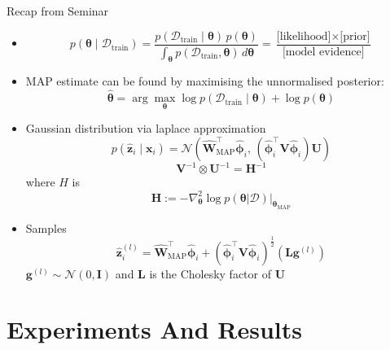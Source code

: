 \documentclass[aspectratio=169,xcolor=dvipsnames]{beamer}
\begin{document}
\begin{frame}{Recap from Seminar}
    \begin{itemize}
        \item<1-> 
        \[
        p(\boldsymbol{\theta} \mid \mathcal{D}_{\text{train}})
        = \frac{p(\mathcal{D}_{\text{train}} \mid \boldsymbol{\theta}) \, p(\boldsymbol{\theta})}{\int_{\boldsymbol{\theta}} p(\mathcal{D}_{\text{train}}, \boldsymbol{\theta}) \, d\boldsymbol{\theta}}
        = \frac{\text{[likelihood]} \times \text{[prior]}}{\text{[model evidence]}}
    \]
        \item<2-> MAP estimate can be found by maximising the unnormalised posterior:
        \[
        \hat{\boldsymbol{\theta}} = \arg\max_{\boldsymbol{\theta}} \log p(\mathcal{D}_{\text{train}} \mid \boldsymbol{\theta}) + \log p(\boldsymbol{\theta})
              \]
        \item<3-> Gaussian distribution via laplace approximation
        \[
        p(\hat{\mathbf{z}}_i \mid \mathbf{x}_i) = \mathcal{N}(\hat{\mathbf{W}}_{\text{MAP}}^\top \hat{\boldsymbol{\phi}}_i, \, (\hat{\boldsymbol{\phi}}_i^\top \mathbf{V} \hat{\boldsymbol{\phi}}_i) \mathbf{U})
        \]
        \[
            \mathbf{V}^{-1} \otimes \mathbf{U}^{-1} = \mathbf{H}^{-1}
        \] where $H$ is 
        \[ \mathbf{H} := - \nabla_{\boldsymbol{\theta}}^2 \log p(\boldsymbol{\theta} | \mathcal{D}) \Big|_{\boldsymbol{\theta}_{\text{MAP}}} \]
        \item<4-> Samples
        \[
         \hat{\mathbf{z}}_i^{(l)} = \hat{\mathbf{W}}_{\text{MAP}}^\top \hat{\boldsymbol{\phi}}_i + (\hat{\boldsymbol{\phi}}_i^\top \mathbf{V} \hat{\boldsymbol{\phi}}_i)^{\frac{1}{2}} (\mathbf{L} \mathbf{g}^{(l)})
        \]
        {\footnotesize \quad $\mathbf{g}^{(l)} \sim \mathcal{N}(0, \mathbf{I})$ and $\mathbf{L}$ is the Cholesky factor of $\mathbf{U}$}
    \end{itemize}
\end{frame}

\section{Experiments And Results}
\end{document}
